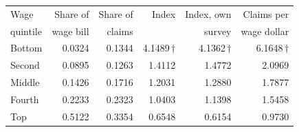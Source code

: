 \small
\begin{tabular}{lrrrrr}
\toprule
Wage & Share of & Share of & Index & Index, own & Claims per \\
quintile & wage bill & claims & & survey & wage dollar \\
\midrule
Bottom & 0.0324 & 0.1344 & 4.1489\,$\dagger$ & 4.1362\,$\dagger$ & 6.1648\,$\dagger$ \\
Second & 0.0895 & 0.1263 & 1.4112 & 1.4772 & 2.0969 \\
Middle & 0.1426 & 0.1716 & 1.2031 & 1.2880 & 1.7877 \\
Fourth & 0.2233 & 0.2323 & 1.0403 & 1.1398 & 1.5458 \\
Top & 0.5122 & 0.3354 & 0.6548 & 0.6154 & 0.9730 \\
\bottomrule
\end{tabular}
